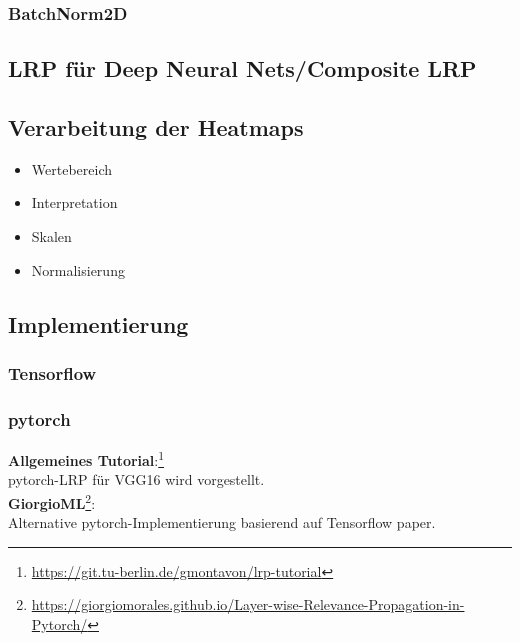 \documentclass[twoside, 12pt,a4paper]{article}
\numberwithin{equation}{section}
\begin{document}
	\subsubsection{BatchNorm2D}
	
	\subsection{LRP für Deep Neural Nets/Composite LRP}
	
	\subsection{Verarbeitung der Heatmaps}
	\begin{itemize}
		\item Wertebereich
		\item Interpretation
		\item Skalen
		\item Normalisierung
	\end{itemize}

	\subsection{Implementierung}
	
	\subsubsection{Tensorflow}
	\subsubsection{pytorch}
	
	\textbf{Allgemeines Tutorial}:\footnote{\url{https://git.tu-berlin.de/gmontavon/lrp-tutorial}}\\ pytorch-LRP für VGG16 wird vorgestellt.\\
	
	
	\noindent \textbf{GiorgioML}\footnote{\url{https://giorgiomorales.github.io/Layer-wise-Relevance-Propagation-in-Pytorch/}}:\\
	Alternative pytorch-Implementierung basierend auf Tensorflow paper.\\
	
\end{document}
